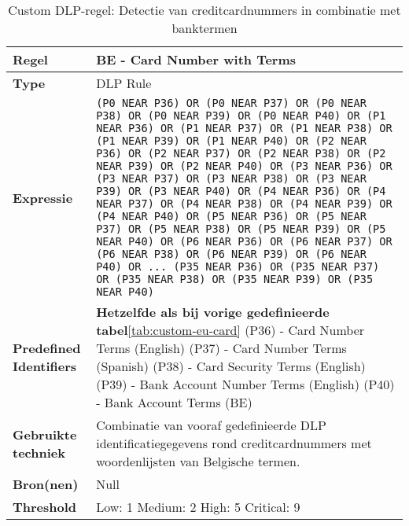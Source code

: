\begin{table}[h]
    \centering
    \small
    \scriptsize
    \begin{tabular}{p{4cm} p{10cm}}
        \toprule
        \textbf{Regel} & BE \-- Card Number with Terms \\
        \midrule
        \textbf{Type} & DLP Rule \\
        \textbf{Expressie} & \texttt{(P0 NEAR P36) OR (P0 NEAR P37) OR (P0 NEAR P38) OR (P0 NEAR P39) OR (P0 NEAR P40) OR (P1 NEAR P36) OR (P1 NEAR P37) OR (P1 NEAR P38) OR (P1 NEAR P39) OR (P1 NEAR P40) OR (P2 NEAR P36) OR (P2 NEAR P37) OR (P2 NEAR P38) OR (P2 NEAR P39) OR (P2 NEAR P40) OR (P3 NEAR P36) OR (P3 NEAR P37) OR (P3 NEAR P38) OR (P3 NEAR P39) OR (P3 NEAR P40) OR (P4 NEAR P36) OR (P4 NEAR P37) OR (P4 NEAR P38) OR (P4 NEAR P39) OR (P4 NEAR P40) OR (P5 NEAR P36) OR (P5 NEAR P37) OR (P5 NEAR P38) OR (P5 NEAR P39) OR (P5 NEAR P40) OR (P6 NEAR P36) OR (P6 NEAR P37) OR (P6 NEAR P38) OR (P6 NEAR P39) OR (P6 NEAR P40) OR \newline
        ... \newline
        (P35 NEAR P36) OR (P35 NEAR P37) OR (P35 NEAR P38) OR (P35 NEAR P39) OR (P35 NEAR P40)} \\
        \textbf{Predefined Identifiers} & 
        \textbf{Hetzelfde als bij vorige gedefinieerde tabel}\ref{tab:custom-eu-card} \newline
        (P36) \-- Card Number Terms (English) \newline
        (P37) \-- Card Number Terms (Spanish) \newline
        (P38) \-- Card Security Terms (English) \newline
        (P39) \-- Bank Account Number Terms (English) \newline
        (P40) \-- Bank Account Terms (BE) \\
        \textbf{Gebruikte techniek} & Combinatie van vooraf gedefinieerde DLP identificatiegegevens rond creditcardnummers met woordenlijsten van Belgische termen. \\
        \textbf{Bron(nen)} & Null \\
        \textbf{Threshold} & Low: 1 \quad Medium: 2 \quad High: 5 \quad Critical: 9 \\
        \bottomrule
    \end{tabular}
    \caption{Custom DLP-regel: Detectie van creditcardnummers in combinatie met banktermen}
    \label{tab:custom-eu-card-terms}
\end{table}


